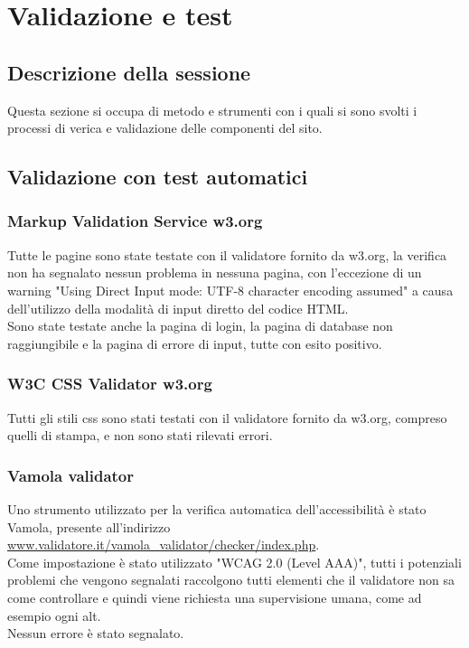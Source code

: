 \documentclass[openany, a4paper, 12pt]{report}
\begin{document}
	\chapter{Validazione e test}
		\section{Descrizione della sessione}
			Questa sezione si occupa di metodo e strumenti con i quali si sono svolti i processi di verica e validazione delle componenti del sito.
		\section{Validazione con test automatici}
			\subsection{Markup Validation Service w3.org}
				Tutte le pagine sono state testate con il validatore fornito da w3.org, la verifica non ha segnalato nessun problema in nessuna pagina, con l'eccezione di un warning "Using Direct Input mode: UTF-8 character encoding assumed" a causa dell'utilizzo della modalità di input diretto del codice HTML.\\
				Sono state testate anche la pagina di login, la pagina di database non raggiungibile e la pagina di errore di input, tutte con esito positivo.
			\subsection{W3C CSS Validator w3.org}
				Tutti gli stili css sono stati testati con il validatore fornito da w3.org, compreso quelli di stampa, e non sono stati rilevati errori.
			\subsection{Vamola validator}
				Uno strumento utilizzato per la verifica automatica dell'accessibilità è stato Vamola, presente all'indirizzo \url{www.validatore.it/vamola_validator/checker/index.php}.\\
				Come impostazione è stato utilizzato "WCAG 2.0 (Level AAA)", tutti i potenziali problemi che vengono segnalati raccolgono tutti elementi che il validatore non sa come controllare e quindi viene richiesta una supervisione umana, come ad esempio ogni alt.\\
				Nessun errore è stato segnalato.
\end{document}
